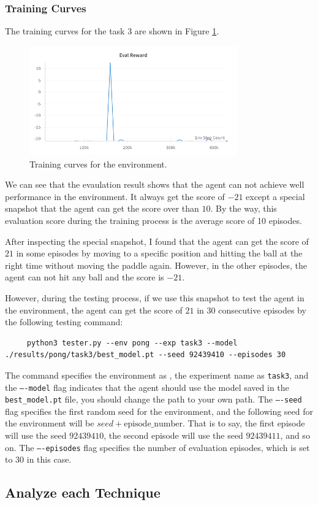 \subsubsection{Training Curves}

The training curves for the task 3 are shown in Figure \ref{fig:pong-task3-training-curve}.
\begin{figure}[H]
    \centering
    \includegraphics[width=0.8\textwidth]{figures/task3.png}
    \caption{Training curves for the \pong environment.}
    \label{fig:pong-task3-training-curve}
\end{figure}

We can see that the evaulation result shows that the agent can not achieve well performance in the \pong environment. It always get the score of $-21$ except a special snapshot that the agent can get the score over than $10$.
By the way, this evaluation score during the training process is the average score of 10 episodes.

After inspecting the special snapshot, I found that the agent can get the score of $21$ in some episodes by moving to a specific position and hitting the ball at the right time without moving the paddle again.
However, in the other episodes, the agent can not hit any ball and the score is $-21$.

However, during the testing process, if we use this snapshot to test the agent in the \pong environment, the agent can get the score of $21$ in 30 consecutive episodes by the following testing command:
\begin{verbatim}
     python3 tester.py --env pong --exp task3 --model ./results/pong/task3/best_model.pt --seed 92439410 --episodes 30
\end{verbatim}

The command specifies the environment as \pong, the experiment name as \texttt{task3}, and the \texttt{----model} flag indicates that the agent should use the model saved in the \texttt{best\_model.pt} file, you should change the path to your own path.
The \texttt{----seed} flag specifies the first random seed for the environment, and the following seed for the environment will be $seed + \text{episode\_number}$. That is to say, the first episode will use the seed $92439410$, the second episode will use the seed $92439411$, and so on.
The \texttt{----episodes} flag specifies the number of evaluation episodes, which is set to $30$ in this case.


\subsection{Analyze each Technique}
